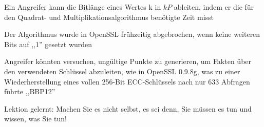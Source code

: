 \documentclass[a4paper]{article}
\begin{document}
\begin{multicols}{3}
\begin{itemize*}
\begin{itemize*}
                  \begin{itemize*}
                        \item Ein Angreifer kann die Bitlänge eines Wertes k in $kP$ ableiten, indem er die für den Quadrat- und Multiplikationsalgorithmus benötigte Zeit misst
                        \item Der Algorithmus wurde in OpenSSL frühzeitig abgebrochen, wenn keine weiteren Bits auf ,,1'' gesetzt wurden
                  \end{itemize*}
                  \item Angreifer könnten versuchen, ungültige Punkte zu generieren, um Fakten über den verwendeten Schlüssel abzuleiten, wie in OpenSSL 0.9.8g, was zu einer Wiederherstellung eines vollen 256-Bit ECC-Schlüssels nach nur 633 Abfragen führte ,,BBP12''
            \end{itemize*}
            \item Lektion gelernt: Machen Sie es nicht selbst, es sei denn, Sie müssen es tun und wissen, was Sie tun!
      \end{itemize*}


\end{multicols}
\end{document}
